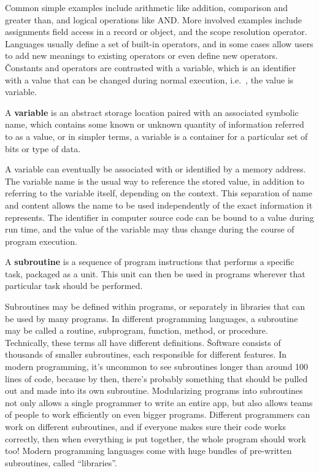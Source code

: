 Common simple examples include arithmetic like addition, comparison and greater than, and logical operations like AND.
More involved examples include assignments field access in a record or object, and the scope resolution operator.
Languages usually define a set of built-in operators, and in some cases allow users to add new meanings to existing
operators or even define new operators. \v

Constants and operators are contrasted with a variable, which is an identifier with a value that can be changed
during normal execution, i.e.\ , the value is variable.

\bd[Variable]
A \textbf{variable} is an abstract storage location paired with an associated symbolic name, which contains some
known or unknown quantity of information referred to as a value, or in simpler terms, a variable is a container for a
particular set of bits or type of data.
\ed

A variable can eventually be associated with or identified by a memory address. The variable name is the usual way to
reference the stored value, in addition to referring to the variable itself, depending on the context. This
separation of name and content allows the name to be used independently of the exact information it represents. The
identifier in computer source code can be bound to a value during run time, and the value of the variable may thus
change during the course of program execution.

\bd[Subroutine]
A \textbf{subroutine} is a sequence of program instructions that performs a specific task, packaged as a unit. This
unit can then be used in programs wherever that particular task should be performed.
\ed

Subroutines may be defined within programs, or separately in libraries that can be used by many programs. In
different programming languages, a subroutine may be called a routine, subprogram, function, method, or procedure.
Technically, these terms all have different definitions. \v

Software consists of thousands of smaller subroutines, each responsible for different features. In modern
programming, it's uncommon to see subroutines longer than around 100 lines of code, because by then, there's probably
something that should be pulled out and made into its own subroutine. Modularizing programs into subroutines not only
allows a single programmer to write an entire app, but also allows teams of people to work efficiently on even bigger
programs. Different programmers can work on different subroutines, and if everyone makes sure their code works
correctly, then when everything is put together, the whole program should work too! Modern programming languages come
with huge bundles of pre-written subroutines, called ``libraries''.

